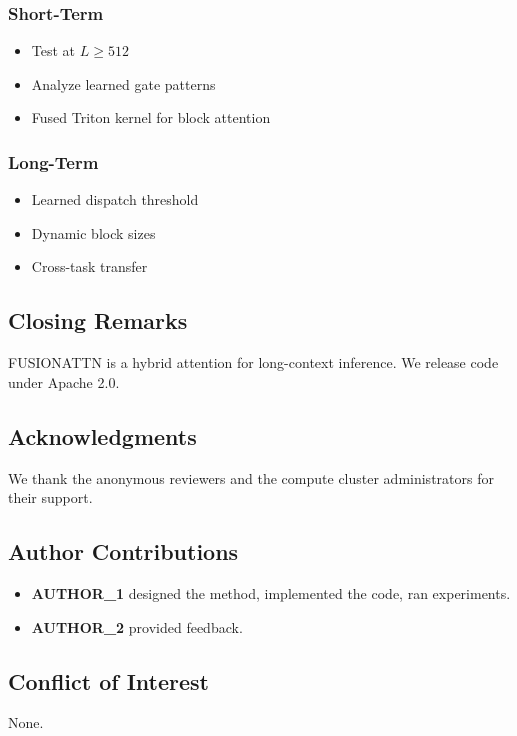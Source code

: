 \subsubsection{Short-Term}
\begin{itemize}
\item Test at $L \geq 512$
\item Analyze learned gate patterns
\item Fused Triton kernel for block attention

\end{itemize}
\subsubsection{Long-Term}
\begin{itemize}
\item Learned dispatch threshold
\item Dynamic block sizes
\item Cross-task transfer

\end{itemize}
\subsection{Closing Remarks}

FUSIONATTN is a hybrid attention for long-context inference. We release 
code under Apache 2.0.

\subsection{Acknowledgments}

We thank the anonymous reviewers and the compute cluster administrators for their support.

\subsection{Author Contributions}

\begin{itemize}
\item \textbf{{{AUTHOR\_1}}} designed the method, implemented the code, ran experiments.
\item \textbf{{{AUTHOR\_2}}} provided feedback.

\end{itemize}
\subsection{Conflict of Interest}

None.

